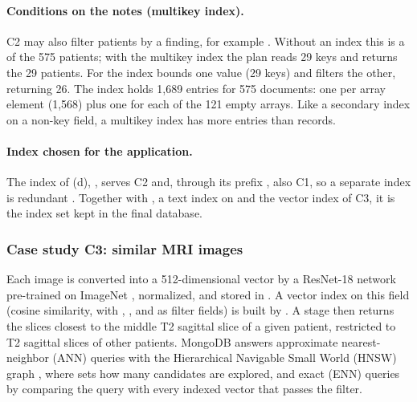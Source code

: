 \paragraph{Conditions on the notes (multikey index).} C2 may also filter patients by a finding,
for example . Without an index this is a  of the
575 patients; with the multikey index  the plan reads 29 keys and returns the 29
patients. For  the index bounds one
value (29 keys) and  filters the other, returning 26. The index holds 1{,}689 entries
for 575 documents: one per array element (1{,}568) plus one for each of the 121 empty arrays.
Like a secondary index on a non-key field, a multikey index has more entries than records.

\paragraph{Index chosen for the application.} The index of (d),
, serves C2 and, through its
prefix , also C1, so a separate  index is redundant
\cite{mongodb-compound}. Together with , a text index on  and the
vector index of C3, it is the index set kept in the final database.

\subsubsection{Case study C3: similar MRI images}
\label{sec:idx-c3}
Each image is converted into a 512-dimensional vector by a ResNet-18 network pre-trained on
ImageNet \cite{he2016resnet}, normalized, and stored in . A vector index on
this field (cosine similarity, with , ,  and
 as filter fields) is built by . A  stage then
returns the slices closest to the middle T2 sagittal slice of a given patient, restricted to T2
sagittal slices of other patients. MongoDB answers approximate nearest-neighbor (ANN) queries with the
Hierarchical Navigable Small World (HNSW) graph \cite{mongodb-vector,malkov2020hnsw}, where
 sets how many candidates are explored, and exact (ENN) queries by comparing the
query with every indexed vector that passes the filter.

